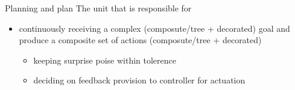 \begin{frame}[allowframebreaks]{Planning and plan}
    The unit that is responsible for
    \begin{itemize}
        \item continuously receiving a complex (composute/tree + decorated) goal and produce a composite set of actions (composute/tree + decorated)
        \begin{itemize}
            \item keeping surprise poise within tolerence
            \item deciding on feedback provision to controller for actuation
        \end{itemize}
    \end{itemize}
\end{frame}